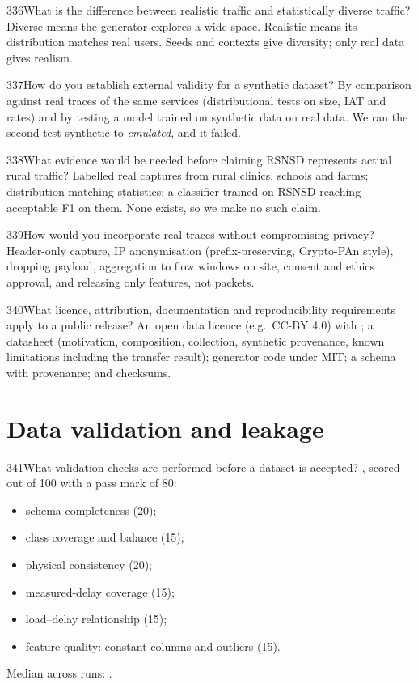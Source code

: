 \begin{qa}{336}{What is the difference between realistic traffic and statistically diverse traffic?}
Diverse means the generator explores a wide space. Realistic means its distribution matches real users. Seeds and
contexts give diversity; only real data gives realism.
\end{qa}

\begin{qa}{337}{How do you establish external validity for a synthetic dataset?}
By comparison against real traces of the same services (distributional tests on size, IAT and rates) and by testing a
model trained on synthetic data on real data. We ran the second test synthetic-to-\emph{emulated}, and it failed.
\end{qa}

\begin{qa}{338}{What evidence would be needed before claiming RSNSD represents actual rural traffic?}
Labelled real captures from rural clinics, schools and farms; distribution-matching statistics; a classifier trained on
RSNSD reaching acceptable F1 on them. None exists, so we make no such claim.
\end{qa}

\begin{qa}{339}{How would you incorporate real traces without compromising privacy?}
Header-only capture, IP anonymisation (prefix-preserving, Crypto-PAn style), dropping payload, aggregation to flow
windows on site, consent and ethics approval, and releasing only features, not packets.
\end{qa}

\begin{qa}{340}{What licence, attribution, documentation and reproducibility requirements apply to a public release?}
An open data licence (e.g.\ CC-BY 4.0) with ; a datasheet (motivation, composition, collection,
synthetic provenance, known limitations including the transfer result); generator code under MIT; a schema with
provenance; and checksums.
\end{qa}

\section{Data validation and leakage}

\begin{qa}{341}{What validation checks are performed before a dataset is accepted?}
, scored out of 100 with a pass mark of 80:
\begin{itemize}
\item schema completeness (20);
\item class coverage and balance (15);
\item physical consistency (20);
\item measured-delay coverage (15);
\item load--delay relationship (15);
\item feature quality: constant columns and outliers (15).
\end{itemize}
Median across runs: \NValidationMedian.
\end{qa}

